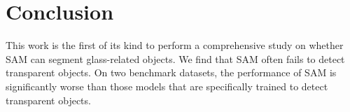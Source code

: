 \documentclass{article}
\begin{document}
\section{Conclusion}
This work is the first of its kind to perform a comprehensive study on whether SAM can segment glass-related objects. We find that SAM often fails to detect transparent objects. On two benchmark datasets, the performance of SAM is significantly worse than those models that are specifically trained to detect transparent objects. 




%
\end{document}
